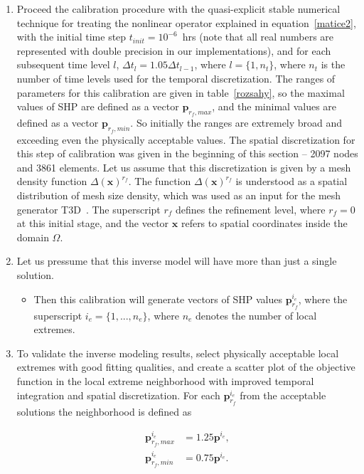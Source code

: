\documentclass[review]{elsarticle}
\newenvironment{lineq}
    {\begin{linenomath*}
    \begin{equation}
    }
    { 
    \end{equation} 
    \end{linenomath*}
    }
\renewcommand{\vec}{\mathbf}
\begin{document}
 \begin{enumerate}[label=({\bf \roman*})]
\item Proceed the calibration procedure with the quasi-explicit stable numerical technique for treating the nonlinear operator explained in equation~\eqref{matice2}, with the initial time step $t_{init}= 10^{-6}$~hrs (note that all real numbers are represented with double precision in our implementations), and for each subsequent time level $l$, $\Delta t_l = 1.05 \Delta t_{l-1}$, where $l=\{1,n_t\}$, where $n_t$ is the number of time levels used for the temporal discretization. The ranges of parameters for this calibration are given in table~\ref{rozsahy}, so the maximal values of SHP are defined as a vector $\vec{p}_{r_f,max}$, and the minimal values are defined as a vector $\vec{p}_{r_f,min}$. So initially the ranges are extremely broad and exceeding even the physically acceptable values. The spatial discretization for this step of calibration was given in the beginning of this section -- 2097 nodes and 3861 elements. 
Let us assume that this discretization is given by a mesh density function ${\Delta}(\vec{x})^{r_f}$. The function $\Delta(\vec{x})^{r_f}$ is understood as a spatial distribution of mesh size density, which was used as an input for the mesh generator T3D~\citep{t3d}. The superscript $r_f$ defines the refinement level, where $r_f=0$ at this initial stage, and the vector $\vec{x}$ refers to spatial coordinates inside the domain $\Omega$.
\item Let us pressume that this inverse model will have more than just a single solution. \begin{itemize} \item Then this calibration will generate vectors of SHP values $\vec{p}^{i_e}_{r_f}$, where the superscript $i_e=\{1,...,n_e\}$, where $n_e$     denotes the number of  local extremes. \end{itemize} 
\item To validate the inverse modeling results, select physically acceptable local extremes with good fitting qualities, and create a scatter plot of the objective function in the local extreme  neighborhood  with improved temporal integration and spatial discretization. For each $\vec{p}^{i_e}_{r_f}$ from the acceptable solutions the neighborhood is defined as
\begin{lineq}
\begin{split}
\vec{p}^{i_e}_{r_f,max} &= 1.25\vec{p}^{i_e}, \\
\vec{p}^{i_e}_{r_f,min} &= 0.75\vec{p}^{i_e}. 
\end{split}
\end{lineq}



\end{enumerate}
\end{document}
